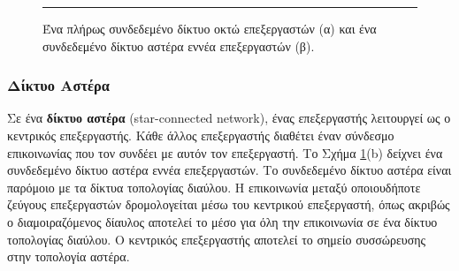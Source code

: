 \documentclass[12pt,a4paper]{article}
\begin{document}
\begin{figure}[H]
\centering
{}
\noindent\rule{\textwidth}{0.2pt}
\caption{Ένα πλήρως συνδεδεμένο δίκτυο οκτώ επεξεργαστών (α) και ένα 
συνδεδεμένο δίκτυο αστέρα εννέα επεξεργαστών (β).}
\label{fig:graph41}
\end{figure}
\vspace{0.3cm}

\subsubsection*{Δίκτυο Αστέρα} 
Σε ένα \textbf{δίκτυο αστέρα} (\foreignlanguage{english}{star-connected network}), 
ένας επεξεργαστής λειτουργεί ως ο κεντρικός επεξεργαστής. Κάθε άλλος 
επεξεργαστής διαθέτει έναν σύνδεσμο επικοινωνίας που τον συνδέει με αυτόν 
τον επεξεργαστή. Το Σχήμα \ref{fig:graph41}(b) δείχνει ένα συνδεδεμένο 
δίκτυο αστέρα εννέα επεξεργαστών. Το συνδεδεμένο δίκτυο αστέρα είναι 
παρόμοιο με τα δίκτυα τοπολογίας διαύλου. Η επικοινωνία μεταξύ οποιουδήποτε 
ζεύγους επεξεργαστών δρομολογείται μέσω του κεντρικού επεξεργαστή, όπως 
ακριβώς ο διαμοιραζόμενος δίαυλος αποτελεί το μέσο για όλη την επικοινωνία 
σε ένα δίκτυο τοπολογίας διαύλου. Ο κεντρικός επεξεργαστής αποτελεί το 
σημείο συσσώρευσης στην τοπολογία αστέρα.
\end{document}
